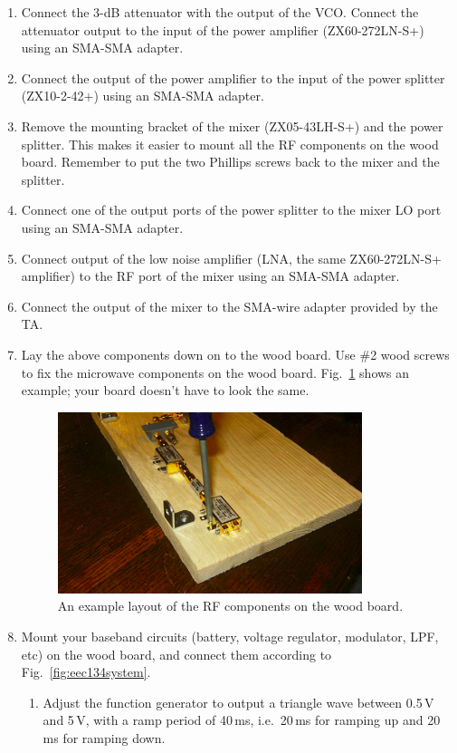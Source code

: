 \documentclass[letterpaper, 11pt]{article}
\begin{document}
\begin{enumerate}
	\item Connect the 3-dB attenuator with the output of the VCO. Connect the attenuator output to the input of the power amplifier (ZX60-272LN-S+) using an SMA-SMA adapter. 
	
	\item Connect the output of the power amplifier to the input of the power splitter (ZX10-2-42+) using an SMA-SMA adapter. 
	
	\item Remove the mounting bracket of the mixer (ZX05-43LH-S+) and the power splitter. This makes it easier to mount all the RF components on the wood board. Remember to put the two Phillips screws back to the mixer and the splitter. %
	
	\item Connect one of the output ports of the power splitter to the mixer LO port using an SMA-SMA adapter.
	
	\item Connect output of the low noise amplifier (LNA, the same ZX60-272LN-S+ amplifier) to the RF port of the mixer using an SMA-SMA adapter.
	
	\item Connect the output of the mixer to the SMA-wire adapter provided by the TA.
	
	\item Lay the above components down on to the wood board. Use \#2 wood screws to fix the microwave components on the wood board. Fig.~\ref{fig:rf-on-wood} shows an example; your board doesn't have to look the same. 
	
	\begin{figure}[h]
		\centering
		\includegraphics[width=3.5in]{rf-on-wood}
		\caption{An example layout of the RF components on the wood board.}
		\label{fig:rf-on-wood}
	\end{figure} 
	
	\item Mount your baseband circuits (battery, voltage regulator, modulator, LPF, etc) on the wood board, and connect them according to Fig.~\ref{fig:eec134system}. 
		\begin{enumerate}
			\item Adjust the function generator to output a triangle wave between 0.5\,V and 5\,V, with a ramp period of 40\,ms, i.e.~20\,ms for ramping up and 20\,ms for ramping down.
		\end{enumerate}
	

\end{enumerate}
\end{document}
